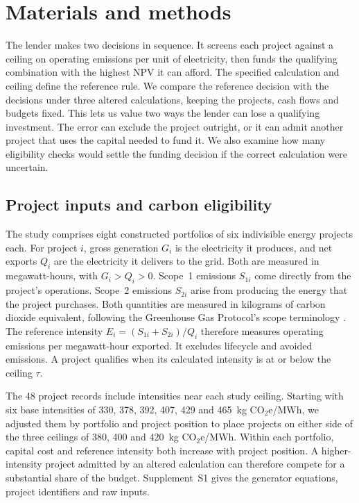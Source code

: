 \documentclass[ijfs,article,submit,oneauthor]{Definitions/mdpi}
\newcommand{\unit}{kg CO$_2$e/MWh}
\begin{document}
\section{Materials and methods}
The lender makes two decisions in sequence. It screens each project against a ceiling on operating emissions per unit of electricity, then funds the qualifying combination with the highest NPV it can afford. The specified calculation and ceiling define the reference rule. We compare the reference decision with the decisions under three altered calculations, keeping the projects, cash flows and budgets fixed. This lets us value two ways the lender can lose a qualifying investment. The error can exclude the project outright, or it can admit another project that uses the capital needed to fund it. We also examine how many eligibility checks would settle the funding decision if the correct calculation were uncertain.

\subsection{Project inputs and carbon eligibility}
The study comprises eight constructed portfolios of six indivisible energy projects each. For project $i$, gross generation $G_i$ is the electricity it produces, and net exports $Q_i$ are the electricity it delivers to the grid. Both are measured in megawatt-hours, with $G_i>Q_i>0$. Scope~1 emissions $S_{1i}$ come directly from the project's operations. Scope~2 emissions $S_{2i}$ arise from producing the energy that the project purchases. Both quantities are measured in kilograms of carbon dioxide equivalent, following the Greenhouse Gas Protocol's scope terminology \citep{ghg}. The reference intensity $E_i=(S_{1i}+S_{2i})/Q_i$ therefore measures operating emissions per megawatt-hour exported. It excludes lifecycle and avoided emissions. A project qualifies when its calculated intensity is at or below the ceiling $\tau$.

The 48 project records include intensities near each study ceiling. Starting with six base intensities of 330, 378, 392, 407, 429 and 465~\unit, we adjusted them by portfolio and project position to place projects on either side of the three ceilings of 380, 400 and 420~\unit. Within each portfolio, capital cost and reference intensity both increase with project position. A higher-intensity project admitted by an altered calculation can therefore compete for a substantial share of the budget. Supplement~S1 gives the generator equations, project identifiers and raw inputs.
\end{document}
